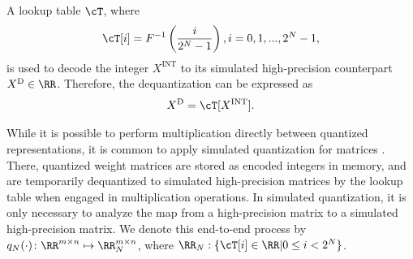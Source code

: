  A lookup table $\cT$, where
\begin{align}
\label{eq:lookup_table}
    \cT[i] = F^{-1}\left( \frac{i}{2^N - 1} \right), i = 0, 1, ..., 2^{N}-1,
\end{align}
is used to decode the integer $X^{\text{INT}}$ to its simulated high-precision counterpart $X^{\text{D}} \in \RR$.
Therefore, the dequantization can be expressed as 
\begin{align}
\label{eq:dequant}
    X^{\text{D}} = \cT[X^{\text{INT}}].
\end{align}

 While it is possible to perform multiplication directly between quantized representations, it is common to apply simulated quantization for matrices \citep{bai2020binarybert, shen2020q}.
There, quantized weight matrices are stored as encoded integers in memory, and are temporarily dequantized to simulated high-precision matrices by the lookup table when engaged in multiplication operations.
In simulated quantization, it is only necessary to analyze the map from a high-precision matrix to a simulated high-precision matrix. We denote this end-to-end process by $q_N(\cdot) \colon \RR^{m \times n} \mapsto \RR_{N}^{m \times n}$, where $\RR_{N}: \{\cT[i] \in \RR | 0 \leq i < 2^N \}$. 


